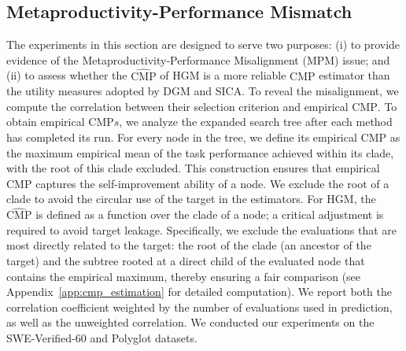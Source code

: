 \documentclass{article} %
\begin{document}
\subsection{Metaproductivity-Performance Mismatch}
\label{sec:metaproductivity-performance-mismatch}
The experiments in this section are designed to serve two purposes: (i) to provide evidence of the Metaproductivity-Performance Misalignment (MPM) issue; and (ii) to assess whether the $\widehat{\mathrm{CMP}}$ of HGM is a more reliable $\mathrm{CMP}$ estimator than the utility measures adopted by DGM and SICA. 
To reveal the misalignment, we compute the correlation between their selection criterion and empirical $\mathrm{CMP}$. 
To obtain empirical $\mathrm{CMP}s$, we analyze the expanded search tree after each method has completed its run. For every node in the tree, we define its empirical $\mathrm{CMP}$ as the maximum empirical mean of the task performance achieved within its clade, with the root of this clade excluded. 
This construction ensures that empirical $\mathrm{CMP}$ captures the self-improvement ability of a node.
We exclude the root of a clade to avoid the circular use of the target in the estimators.
For HGM, the $\widehat{\mathrm{CMP}}$ is defined as a function over the clade of a node; a critical adjustment is required to avoid target leakage. 
Specifically, we exclude the evaluations that are most directly related to the target: the root of the clade (an ancestor of the target) and the subtree rooted at a direct child of the evaluated node that contains the empirical maximum, thereby ensuring a fair comparison (see Appendix~\ref{app:cmp_estimation} for detailed computation). 
We report both the correlation coefficient weighted by the number of evaluations used in prediction, as well as the unweighted correlation.
We conducted our experiments on the SWE-Verified-60 and Polyglot datasets.
\end{document}
